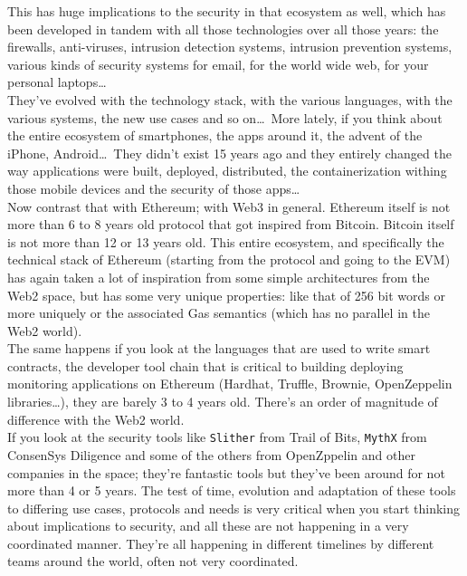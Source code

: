 This has huge implications to the security in that ecosystem as well, which has been developed in tandem with all those technologies over all those years: the firewalls, anti-viruses, intrusion detection systems, intrusion prevention systems, various kinds of security systems for email, for the world wide web, for your personal laptops\dots\\

They've evolved with the technology stack, with the various languages, with the various systems, the new use cases and so on\dots\,
More lately, if you think about the entire ecosystem of smartphones, the apps around it, the advent of the iPhone, Android\dots\,
They didn't exist 15 years ago and they entirely changed the way applications were built, deployed, distributed, the containerization withing those mobile devices and the security of those apps\dots\\

Now contrast that with Ethereum; with Web3 in general.
Ethereum itself is not more than 6 to 8 years old protocol that got inspired from Bitcoin.
Bitcoin itself is not more than 12 or 13 years old.
This entire ecosystem, and specifically the technical stack of Ethereum (starting from the protocol and going to the EVM) has again taken a lot of inspiration from some simple architectures from the Web2 space, but has some very unique properties: like that of 256 bit words or more uniquely or the associated Gas semantics (which has no parallel in the Web2 world).\\

The same happens if you look at the languages that are used to write smart contracts, the developer tool chain that is critical to building deploying monitoring applications on Ethereum (Hardhat, Truffle, Brownie, OpenZeppelin libraries\dots), they are barely 3 to 4 years old.
There's an order of magnitude of difference with the Web2 world.\\

If you look at the security tools like \texttt{Slither} from Trail of Bits, \texttt{MythX} from ConsenSys Diligence and some of the others from OpenZppelin and other companies in the space; they're fantastic tools but they've been around for not more than 4 or 5 years.
The test of time, evolution and adaptation of these tools to differing use cases, protocols and needs is very critical when you start thinking about implications to security, and all these are not happening in a very coordinated manner.
They're all happening in different timelines by different teams around the world, often not very coordinated.

